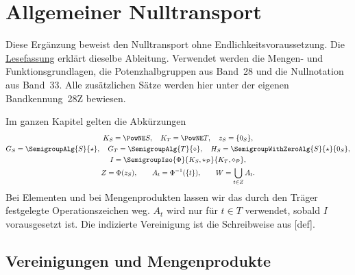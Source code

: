 \chapter{Allgemeiner Nulltransport}
\hypertarget{zero-transport.proofs}{}

Diese Ergänzung beweist den Nulltransport ohne Endlichkeitsvoraussetzung.
Die \href{_B28-zero-transport-reading.pdf\#zero-transport.reading}{Lesefassung}
erklärt dieselbe Ableitung. Verwendet werden die Mengen- und
Funktionsgrundlagen, die Potenzhalbgruppen aus Band~28 und die
Nullnotation aus Band~33. Alle zusätzlichen Sätze werden hier unter
der eigenen Bandkennung~28Z bewiesen.

Im ganzen Kapitel gelten die Abkürzungen
\[
 \begin{gathered}
 K_S=\PowNE S,\quad K_T=\PowNE T,\quad z_S=\{0_S\},\\
 G_S=\SemigroupAlg{S}{\star},\quad G_T=\SemigroupAlg{T}{\diamond},\quad
 H_S=\SemigroupWithZeroAlg{S}{\star}{0_S},\\
 I=\SemigroupIso{\Phi}{K_S,\star_{\mathcal P}}{K_T,\diamond_{\mathcal P}},\\
 Z=\Phi(z_S),\qquad A_t=\Phi^{-1}(\{t\}),\qquad
 W=\bigcup_{t\in Z}A_t.
 \end{gathered}
\]
Bei Elementen und bei Mengenprodukten lassen wir das durch den Träger
festgelegte Operationszeichen weg. \(A_t\) wird nur für \(t\in T\)
verwendet, sobald \(I\) vorausgesetzt ist. Die indizierte Vereinigung
ist die Schreibweise aus
[def].

\clearpage
\section{Vereinigungen und Mengenprodukte}

\begin{tabproofwide}
\end{tabproofwide}


